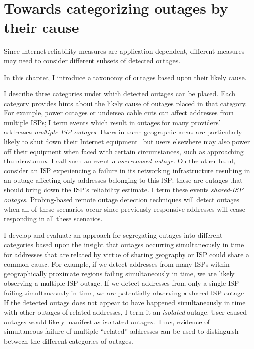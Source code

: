 
\chapter{Towards categorizing outages by
  their cause}
\label{cpt:corrfails}

Since Internet reliability measures are application-dependent,
different measures may need to consider different subsets of detected
outages.

In this chapter, I introduce a taxonomy of outages based upon their
likely cause.


I describe three categories under which detected outages can be 
placed. Each category provides hints about the likely cause of outages
placed in that category. For example, power outages or undersea cable cuts can affect addresses from multiple
ISPs; I term events which result in outages for
many providers' addresses \emph{multiple-ISP outages}. Users in some
geographic areas are particularly likely to shut down their Internet
equipment~\cite{grover2013peeking} but users elsewhere may also power
off their equipment when faced with certain circumstances, such as
approaching thunderstorms. I call such an event a \emph{user-caused
outage}. On the other hand, consider an ISP experiencing a failure in
its networking infrastructure resulting in an outage affecting only
addresses belonging to this ISP: these are outages that should bring down the ISP's reliability
estimate. I term these events \emph{shared-ISP outages}.
Probing-based remote outage detection techniques will detect outages
when all of these scenarios occur since previously responsive
addresses will cease responding in all these scenarios.

I develop and evaluate an approach for segregating outages into different categories
based upon the insight that outages occurring simultaneously in time
for addresses that are related by virtue of sharing geography or ISP
could share a common cause. For example, if we detect addresses from
many ISPs within geographically proximate regions failing simultaneously in time, we are likely observing a
multiple-ISP outage. If we detect addresses from only a single ISP
failing simultaneously in time, we are potentially observing a
shared-ISP outage. If the detected outage does not appear to
have happened simultaneously in time with other outages of related
addresses, I term it an \emph{isolated} outage. User-caused outages would
likely manifest as isoltated outages. Thus, evidence
of simultaneous failure of multiple
``related'' addresses can be used to distinguish between the different
categories of outages. 


